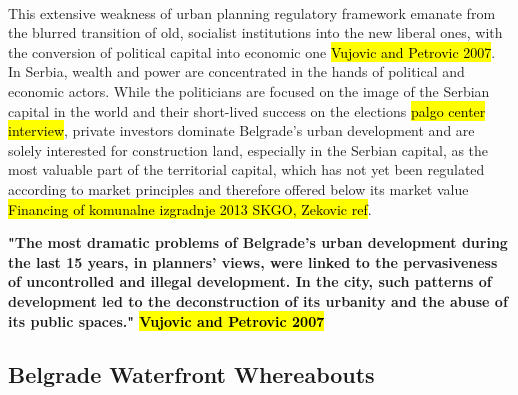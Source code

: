 \documentclass[11pt]{report}
\begin{document}
\\ 
This extensive weakness of urban planning regulatory framework emanate from the blurred transition of old, socialist institutions into the new liberal ones, with the conversion of political capital into economic one \hl{Vujovic and Petrovic 2007}.
In Serbia, wealth and power are concentrated in the hands of political and economic actors. While the politicians are focused on the image of the Serbian capital in the world and their short-lived success on the elections \hl{palgo center interview}, private investors dominate Belgrade's urban development and are solely interested for construction land, especially in the Serbian capital, as the most valuable part of the territorial capital, which has not yet been regulated according to market principles and therefore offered below its market value \hl{Financing of komunalne izgradnje 2013 SKGO, Zekovic ref}. 
    
\textbf{"The most dramatic problems of Belgrade’s urban development during the last 15 years, in planners’ views, were linked to the pervasiveness of uncontrolled and illegal development. In the city, such patterns of development led to the deconstruction of its urbanity and the abuse of its public spaces." \hl{Vujovic and Petrovic 2007}}

\subsection{Belgrade Waterfront Whereabouts}
\end{document}
